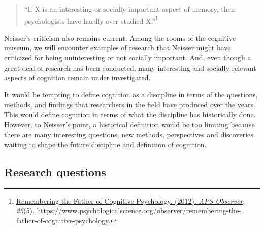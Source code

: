 \documentclass[
  oneside,
  12pt]{crumpbook}
\begin{document}
\begin{quote}
``If X is an interesting or socially important aspect of memory, then psychologists have hardly ever studied X.''\footnote{\protect\hyperlink{ref-RememberingFatherCognitive2012}{Remembering the {Father} of {Cognitive Psychology}. (2012). \emph{APS Observer}, \emph{25}(5). \url{https://www.psychologicalscience.org/observer/remembering-the-father-of-cognitive-psychology}}.}
\end{quote}

Neisser's criticism also remains current. Among the rooms of the cognitive museum, we will encounter examples of research that Neisser might have criticized for being uninteresting or not socially important. And, even though a great deal of research has been conducted, many interesting and socially relevant aspects of cognition remain under investigated.

It would be tempting to define cognition as a discipline in terms of the questions, methods, and findings that researchers in the field have produced over the years. This would define cognition in terms of what the discipline has historically done. However, to Neisser's point, a historical definition would be too limiting because there are many interesting questions, new methods, perspectives and discoveries waiting to shape the future discipline and definition of cognition.

\hypertarget{research-questions}{%
\subsection{Research questions}\label{research-questions}}
\end{document}

